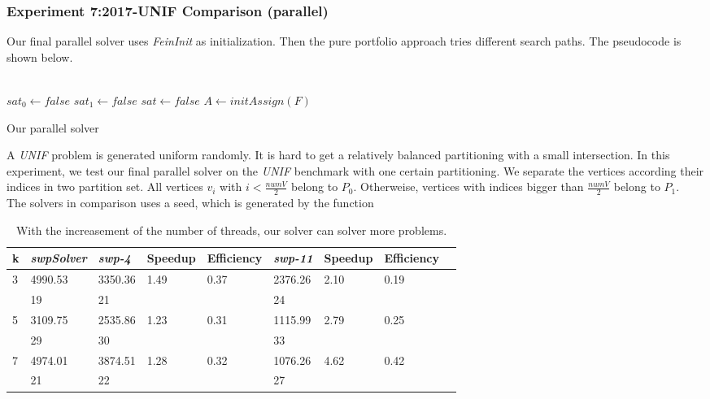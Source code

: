 \documentclass[12pt,a4paper,twoside]{scrartcl}
\numberwithin{equation}{section}
\begin{document}
\subsubsection{Experiment 7:2017-UNIF Comparison (parallel)} 
\label{sec:Experiment 7}
Our final parallel solver uses \emph{FeinInit} as initialization. Then the pure portfolio approach tries different search paths. The pseudocode is shown below.\\
\\
\begin{algorithm}[H]
  $sat_0 \leftarrow false$\;
  $sat_1 \leftarrow false$\;
  $sat \leftarrow false$\;
  $A \leftarrow initAssign(F)$\;
 \caption{Our parallel solver}
\end{algorithm}  

A \emph{UNIF} problem is generated uniform randomly. It is hard to get a relatively balanced partitioning with a small intersection. In this experiment, we test our final parallel solver on the \emph{UNIF}  benchmark with one certain partitioning. We separate the vertices according their indices in two partition set. All vertices $v_i$ with $i <\frac{numV}{2}$  belong to $P_0$. Otherweise, vertices with indices bigger than $\frac{numV}{2}$  belong to $P_1$.\\
The solvers in comparison uses a seed, which is generated by the function 
 \begin{table}[H]
\begin{center}
    \begin{tabular}{|l|l||l|l|l||l|l|l|p{3cm}|}
\hline 
   k &\emph{swpSolver}&\emph{swp-4}&Speedup& Efficiency&\emph{swp-11}&Speedup& Efficiency\\ \hline      
    3 &4990.53&3350.36&1.49&0.37&2376.26&2.10&0.19 \\
     &19 &21&&&24&& \\ \hline
    5&3109.75	&2535.86&1.23&0.31&1115.99&2.79&0.25\\ 
    &29&30&&&33&&\\ \hline
    7& 4974.01&3874.51	&1.28&0.32&1076.26&4.62&0.42\\ 
    &21&22&&&27&&\\ \hline
    \end{tabular}
\end{center}
\caption{With the increasement of the number of threads, our solver can solver more problems.}
\end{table}
\end{document}
